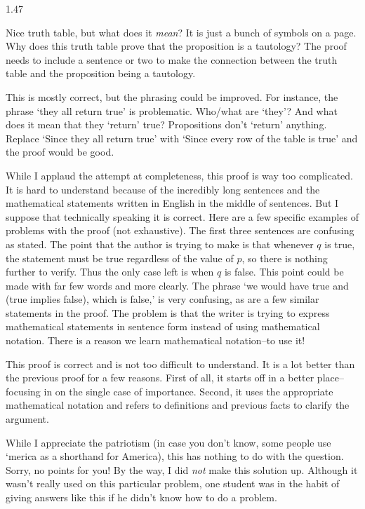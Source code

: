 \begin{Answer}{1.47}
\begin{pfevalenum}
\item
Nice truth table, but what does it {\em mean}?  It is just a bunch of symbols on a page.
Why does this truth table prove that the proposition is a tautology?
The proof needs to include a sentence or two to make the connection between the truth table and
the proposition being a tautology.
\item
 This is mostly correct, but the phrasing could be improved.  For instance, the phrase
`they all return true' is problematic.  Who/what are `they'?  And what does it mean that they
`return' true?   Propositions don't `return' anything.
Replace `Since they all return true' with `Since every row of the table is true' and the proof would be good.
\item
While I applaud the attempt at completeness, this proof is way too complicated.  It is hard to
understand because of the incredibly long sentences and the mathematical statements written in English
in the middle of sentences.  But I suppose that technically speaking it is correct.
Here are a few specific examples of problems with the proof (not exhaustive).
The first three sentences are confusing as stated.  The point that the
author is trying to make is that whenever $q$ is true, the statement must be true regardless of the value of $p$,
so there is nothing further to verify.  Thus the only case left is when $q$ is false.  This point could be made
with far few words and more clearly.
The phrase `we would have true and (true implies false), which is false,' is very confusing, as are a few similar
statements in the proof.  The problem is that the writer is trying to express mathematical statements in
sentence form instead of using mathematical notation.
There is a reason we learn mathematical notation--to use it!
\item
This proof is correct and is not too difficult to understand.  It is a lot better than the previous proof for a few
reasons.  First of all, it starts off in a better place--focusing in on the single case of importance.
Second, it uses the appropriate mathematical notation and refers to definitions and previous facts to clarify the argument.
\item
While I appreciate the patriotism (in case you don't know, some people use `merica as a shorthand for America),
this has nothing to do with the question.  Sorry, no points for you!
By the way, I did {\em not} make this solution up.  Although it wasn't really used on this particular problem,
one student was in the habit of giving answers like this if he didn't know how to do a problem.
\end{pfevalenum}
\end{Answer}
